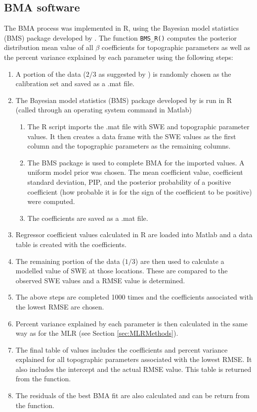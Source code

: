 \documentclass{sfuthesis}
\begin{document}
\begin{appendices}
	\chapter{BMA software}
\label{sec:BMAmethods}
The BMA process was implemented in R, using the Bayesian model statistics (BMS) package developed by \cite{Zeugner2015}. The function \texttt{BMS\_R()} computes the posterior distribution mean value of all $\beta$ coefficients for topographic parameters as well as the percent variance explained by each parameter using the following steps:
\begin{enumerate}
\item A portion of the data ($2/3$ as suggested by \cite{Kohavi1995}) is randomly chosen as the calibration set and saved as a .mat file. 
\item The Bayesian model statistics (BMS) package developed by \cite{Zeugner2015} is run in R (called through an operating system command in Matlab)
	\begin{enumerate}
		\item The R script imports the .mat file with SWE and topographic parameter values. It then creates a data frame with the SWE values as the first column and the topographic parameters as the remaining 	columns. 
		\item The BMS package is used to complete BMA for the imported values. A uniform model prior was chosen. The mean coefficient value, coefficient standard deviation, PIP, and the posterior probability of a positive coefficient (how probable it is for the sign of the coefficient to be positive) were computed.
		\item The coefficients are saved as a .mat file.
	\end{enumerate}
\item Regressor coefficient values calculated in R are loaded into Matlab and a data table is created with the coefficients.
\item The remaining portion of the data ($1/3$) are then used to calculate a modelled value of SWE at those locations. These are compared to the observed SWE values and a RMSE value is determined.
\item The above steps are completed 1000 times and the coefficients associated with the lowest RMSE are chosen.
\item Percent variance explained by each parameter is then calculated in the same way as for the MLR (see Section \ref{sec:MLRMethods}). 
\item The final table of values includes the coefficients and percent variance explained for all topographic parameters associated with the lowest RMSE. It also includes the intercept and the actual RMSE value. This table is returned from the function.
\item The residuals of the best BMA fit are also calculated and can be return from the function.  
\end{enumerate}
	



\end{appendices}
\end{document}

